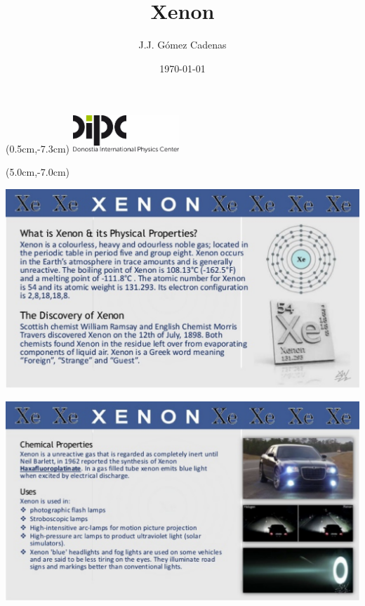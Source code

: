 \documentclass [aspectratio=169]{beamer}
\title[]{\vspace{60pt} \\
Xenon} %
\author[]{J.J. Gómez Cadenas}
\institute[]{Donostia International Physics Center}
\date{\today}
\begin{document}
{
\begin{frame}
    \titlepage
    \begin{textblock*}{4cm}(0.5cm,-7.3cm)
        \includegraphics[width=4cm]{dipc.png}
    \end{textblock*}
    \begin{textblock*}{8cm}(5.0cm,-7.0cm)
        \huge {} %
    \end{textblock*}
\end{frame}
}

\begin{frame}{}
\includegraphics[scale=0.28]{ xenon1.png}
\end{frame}

\begin{frame}{}
\includegraphics[scale=0.28]{ xenon2.png}
\end{frame}
\end{document}
